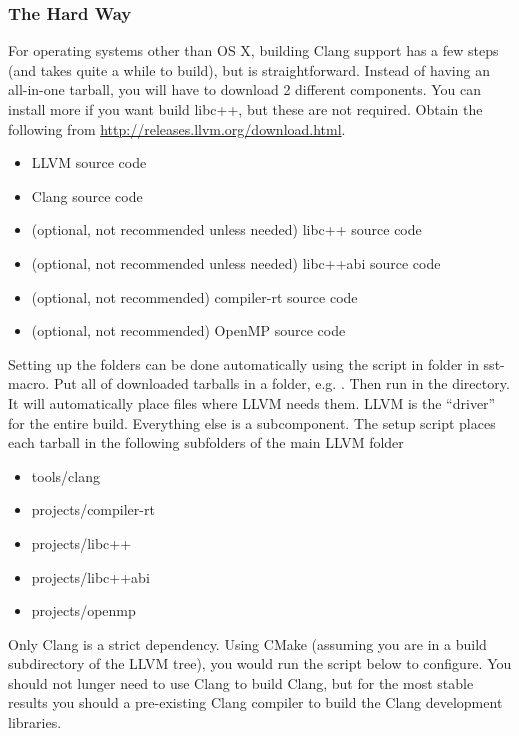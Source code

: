 \subsubsection{The Hard Way}
\label{subsubsec:libTooling}
For operating systems other than OS X, building Clang support has a few steps (and takes quite a while to build), but is straightforward.
Instead of having an all-in-one tarball, you will have to download 2 different components. You can install more if you want build libc++, but these are not required.
Obtain the following from \url{http://releases.llvm.org/download.html}.

\begin{itemize}
\item LLVM source code
\item Clang source code
\item (optional, not recommended unless needed) libc++ source code
\item (optional, not recommended unless needed) libc++abi source code
\item (optional, not recommended) compiler-rt source code
\item (optional, not recommended) OpenMP source code
\end{itemize}

Setting up the folders can be done automatically using the  script in  folder in sst-macro. Put all of downloaded tarballs in a folder, e.g. . Then run  in the directory. 
It will automatically place files where LLVM needs them.
LLVM is the ``driver'' for the entire build. Everything else is a subcomponent. 
The setup script places each tarball in the following subfolders of the main LLVM folder

\begin{itemize}
\item tools/clang
\item projects/compiler-rt
\item projects/libc++
\item projects/libc++abi
\item projects/openmp
\end{itemize}

Only Clang is a strict dependency. Using CMake (assuming you are in a build subdirectory of the LLVM tree), you would run the script below to configure.
You should not lunger need to use Clang to build Clang, but for the most stable results you should a pre-existing Clang compiler to build the Clang development libraries.

